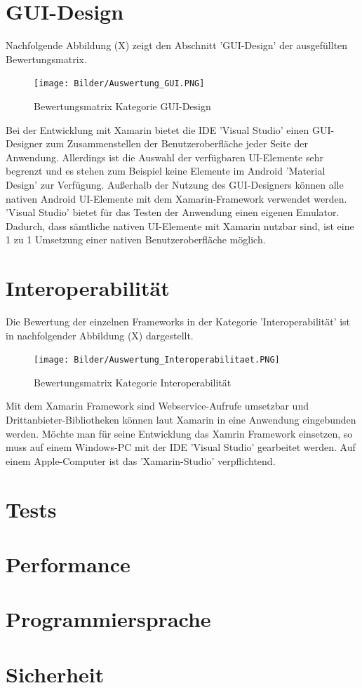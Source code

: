 \section{GUI-Design}

Nachfolgende Abbildung (X) zeigt den Abschnitt 'GUI-Design' der ausgefüllten Bewertungsmatrix.

\begin{figure}[h]
	\centering
	\texttt{[image: Bilder/Auswertung\_GUI.PNG]}
	\caption{Bewertungsmatrix Kategorie GUI-Design}
	\label{fig:AuswGUI}
\end{figure}

Bei der Entwicklung mit Xamarin bietet die IDE 'Visual Studio' einen GUI-Designer zum Zusammenstellen der Benutzeroberfläche jeder Seite der Anwendung. Allerdings ist die Auswahl der verfügbaren UI-Elemente sehr begrenzt und es stehen zum Beispiel keine Elemente im Android 'Material Design' zur Verfügung. Außerhalb der Nutzung des GUI-Designers können alle nativen Android UI-Elemente mit dem Xamarin-Framework verwendet werden. 'Visual Studio' bietet für das Testen der Anwendung einen eigenen Emulator. Dadurch, dass sämtliche nativen UI-Elemente mit Xamarin nutzbar sind, ist eine 1 zu 1 Umsetzung einer nativen Benutzeroberfläche möglich. 

\section{Interoperabilität}

Die Bewertung der einzelnen Frameworks in der Kategorie 'Interoperabilität' ist in nachfolgender Abbildung (X) dargestellt.

\begin{figure}[h]
	\centering
	\texttt{[image: Bilder/Auswertung\_Interoperabilitaet.PNG]}
	\caption{Bewertungsmatrix Kategorie Interoperabilität}
	\label{fig:AuswInterop}
\end{figure}

Mit dem Xamarin Framework sind Webservice-Aufrufe umsetzbar und Drittanbieter-Bibliotheken können laut Xamarin in eine Anwendung eingebunden werden. Möchte man für seine Entwicklung das Xamrin Framework einsetzen, so muss auf einem Windows-PC mit der IDE 'Visual Studio' gearbeitet werden. Auf einem Apple-Computer ist das 'Xamarin-Studio' verpflichtend. 

\section{Tests}

\section{Performance}

\section{Programmiersprache}

\section{Sicherheit}
